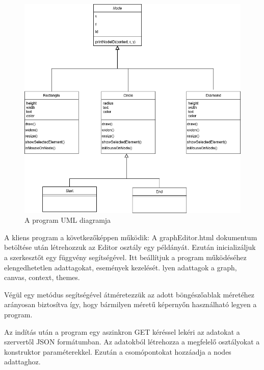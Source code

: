 

\begin{figure}[h]
\centering
\includegraphics[scale=0.5]{images/umldiagram.png}
\caption{A program UML diagramja}
\label{fig:uml}
\end{figure}

A kliens program a következőképpen működik: A graphEditor.html dokumentum betöltése után létrehozzuk az Editor osztály egy példányát. Ezután inicializáljuk a szerkesztőt egy függvény segítségével. Itt beállítjuk a program működéséhez elengedhetetlen adattagokat, események kezelését. lyen adattagok a graph, canvas, context, themes.

Végül egy metódus segítségével átméretezzük az adott böngészőablak méretéhez arányosan biztosítva így, hogy bármilyen méretű képernyőn használható legyen a program.

Az indítás után a program egy aszinkron GET kéréssel lekéri az adatokat a szervertől JSON formátumban. Az adatokból létrehozza a megfelelő osztályokat a konstruktor paraméterekkel. Ezután a csomópontokat hozzáadja a nodes adattaghoz.

